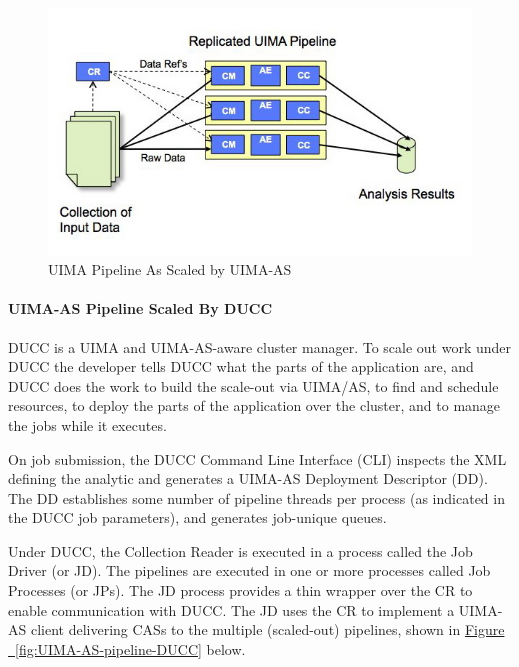     \begin{figure}[H]
      \centering
      \includegraphics[bb=0 0 584 341, width=5.5in]{images/uima-as-pipeline.jpg}
      \caption{UIMA Pipeline As Scaled by UIMA-AS}
      \label{fig:UIMA-AS-pipeline}
    \end{figure}

    \paragraph{UIMA-AS Pipeline Scaled By DUCC}
    DUCC is a UIMA and  UIMA-AS-aware cluster manager.  To scale out work under DUCC the developer
    tells DUCC what the parts of the application are, and DUCC does the work to build the
    scale-out via UIMA/AS, to find and schedule resources, to deploy the parts of the application
    over the cluster, and to manage the jobs while it executes.

    On job submission, the DUCC Command Line Interface (CLI) inspects the XML defining the analytic
    and generates a UIMA-AS Deployment Descriptor (DD).  The DD establishes some number of pipeline
    threads per process (as indicated in the DUCC job parameters), and generates job-unique queues.

    Under DUCC, the Collection Reader is executed in a process called the Job Driver (or JD). The 
    pipelines are executed in one or more processes called Job Processes (or JPs). The JD 
    process provides a thin wrapper over the CR to enable communication with DUCC.  The JD uses the
    CR to implement a UIMA-AS client delivering CASs to the multiple (scaled-out) pipelines, 
    shown in \hyperref[fig:UIMA-AS-pipeline-DUCC]{Figure ~\ref{fig:UIMA-AS-pipeline-DUCC}} below.

